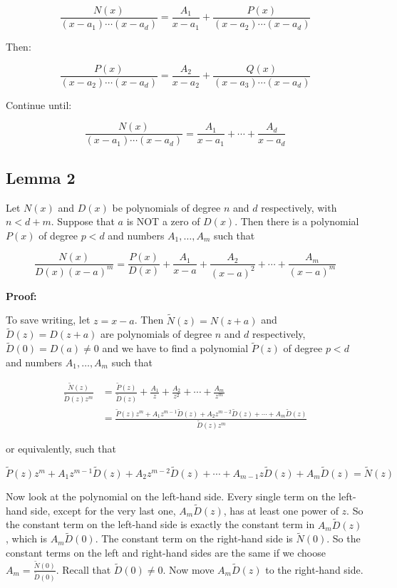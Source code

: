 \[
\frac{N(x)}{(x - a_1)\cdots(x - a_d)} = \frac{A_1}{x - a_1} + \frac{P(x)}{(x - a_2)\cdots(x - a_d)}
\]

Then:

\[
\frac{P(x)}{(x - a_2)\cdots(x - a_d)} = \frac{A_2}{x - a_2} + \frac{Q(x)}{(x - a_3)\cdots(x - a_d)}
\]

Continue until:

\[
\frac{N(x)}{(x - a_1)\cdots(x - a_d)} = \frac{A_1}{x - a_1} + \cdots + \frac{A_d}{x - a_d}
\]

\subsection{Lemma 2}

Let \(N(x)\) and \(D(x)\) be polynomials of degree \(n\) and \(d\) respectively, with \(n < d + m\).
Suppose that \(a\) is NOT a zero of \(D(x)\). Then there is a polynomial \(P(x)\) of degree \(p < d\) and
numbers \(A_1, \dots, A_m\) such that

\[
\frac{N(x)}{D(x) {(x-a)}^m} = \frac{P(x)}{D(x)} + \frac{A_1}{x-a} + \frac{A_2}{{(x-a)}^2} + \cdots + \frac{A_m}{{(x-a)}^m}
\]

\textbf{Proof:} 

To save writing, let \(z = x - a\). Then \(\tilde{N}(z) = N(z + a)\) and \(\tilde{D}(z) = D(z + a)\)
are polynomials of degree \(n\) and \(d\) respectively, \(\tilde{D}(0) = D(a) \neq 0\) and we have to find a
polynomial \(\tilde{P}(z)\) of degree \(p < d\) and numbers \(A_1, \dots, A_m\) such that

\begin{align*}
\frac{\tilde{N}(z)}{\tilde{D}(z) z^m} &= \frac{\tilde{P}(z)}{\tilde{D}(z)} + \frac{A_1}{z} + \frac{A_2}{z^2} + \cdots + \frac{A_m}{z^m} \\
&= \frac{\tilde{P}(z) z^m + A_1 z^{m-1} \tilde{D}(z) + A_2 z^{m-2} \tilde{D}(z) + \cdots + A_m \tilde{D}(z)}{\tilde{D}(z) z^m}
\end{align*}

or equivalently, such that

\[
\tilde{P}(z)z^m + A_1 z^{m-1} \tilde{D}(z) + A_2 z^{m-2} \tilde{D}(z) + \cdots + A_{m-1} z \tilde{D}(z) + A_m \tilde{D}(z) = \tilde{N}(z)
\]

Now look at the polynomial on the left-hand side. Every single term on the left-hand side,
except for the very last one, \(A_m \tilde{D}(z)\), has at least one power of \(z\). So the constant term on
the left-hand side is exactly the constant term in \(A_m \tilde{D}(z)\), which is \(A_m \tilde{D}(0)\). The constant
term on the right-hand side is \(\tilde{N}(0)\). So the constant terms on the left and right-hand sides
are the same if we choose \(A_m = \frac{\tilde{N}(0)}{\tilde{D}(0)}\). Recall that \(\tilde{D}(0) \neq 0\). 
Now move \(A_m \tilde{D}(z)\) to the right-hand side.

